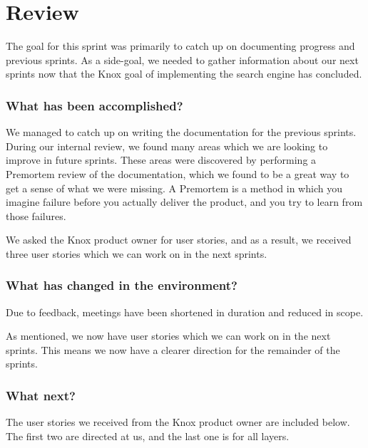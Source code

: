 \section{Review}
The goal for this sprint was primarily to catch up on documenting progress and previous sprints. As a side-goal, we needed to gather information about our next sprints now that the Knox goal of implementing the search engine has concluded.

\subsubsection*{What has been accomplished?}
We managed to catch up on writing the documentation for the previous sprints. During our internal review, we found many areas which we are looking to improve in future sprints. These areas were discovered by performing a Premortem review of the documentation, which we found to be a great way to get a sense of what we were missing. A Premortem is a method in which you imagine failure before you actually deliver the product, and you try to learn from those failures\cite{PremortemSadanForbedrer}.

We asked the Knox product owner for user stories, and as a result, we received three user stories which we can work on in the next sprints.

\subsubsection*{What has changed in the environment?}
Due to feedback, meetings have been shortened in duration and reduced in scope. 

As mentioned, we now have user stories which we can work on in the next sprints. This means we now have a clearer direction for the remainder of the sprints.

\subsubsection*{What next?}
The user stories we received from the Knox product owner are included below. The first two are directed at us, and the last one is for all \knox{} layers.


